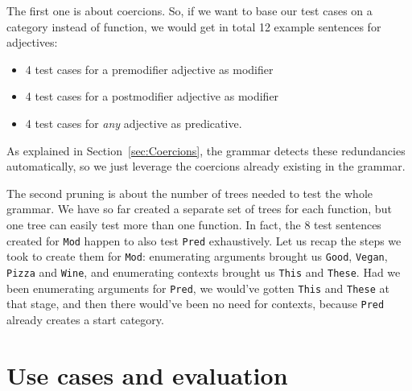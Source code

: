 \documentclass[runningheads]{llncs}
\def\t#1{\texttt{#1}}
\def\pmcfg{\textsc{pmcfg}}
\newcommand{\quality}[1]{${\tt Quality_{#1}}$}
\newcommand{\very}[1]{${\tt Very_{#1}}$}
\begin{document}
The first one is about coercions.
So, if we want to base our test cases on a category instead of
function, we would get in total 12 example sentences for adjectives:
\begin{itemize}
\item 4 test cases for a premodifier adjective as modifier
\item 4 test cases for a postmodifier adjective as modifier
\item 4 test cases for \emph{any} adjective as predicative.
\end{itemize}
 As explained in Section~\ref{sec:Coercions}, the grammar detects
these redundancies automatically, so we just leverage the coercions
already existing in the grammar.


The second pruning is about the number of trees needed to test the
whole grammar. We have so far created a separate set of trees for each
function, but one tree can easily test more than one function.
In fact, the 8 test sentences created for \t{Mod} happen to also test \t{Pred} exhaustively.
Let us recap the steps we took to create them for \t{Mod}:
enumerating arguments brought us \t{Good}, \t{Vegan}, \t{Pizza} and
\t{Wine}, and enumerating contexts brought us \t{This} and
\t{These}. Had we been enumerating arguments for \t{Pred}, we would've
gotten \t{This} and \t{These} at that stage, and then there would've
been no need for contexts, because \t{Pred} already creates a start category.


\section{Use cases and evaluation}
\end{document}
